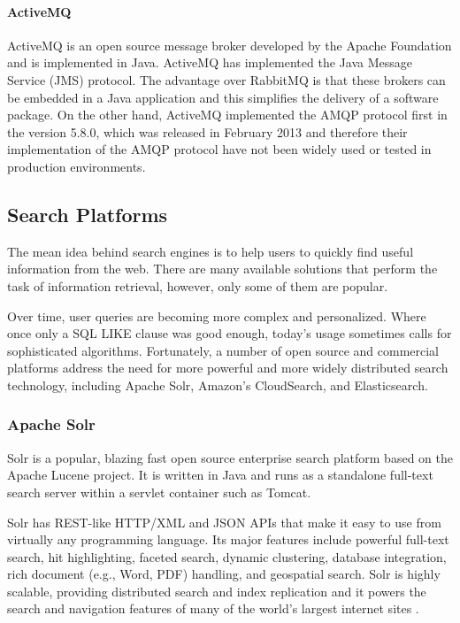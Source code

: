 \begin{itemize}
\end{itemize}

\paragraph{ActiveMQ}
ActiveMQ is an open source message broker developed by the Apache Foundation and is implemented in Java. ActiveMQ has implemented the Java Message Service (JMS) protocol. The advantage over RabbitMQ is that these brokers can be embedded in a Java application and this simplifies the delivery of a software package. On the other hand, ActiveMQ implemented the \ac{AMQP} protocol first in the version 5.8.0, which was released in February 2013 and therefore their implementation of the \ac{AMQP} protocol have not been widely used or tested in production environments.

\subsection{Search Platforms \label{sec:back_se_en}}
The mean idea behind search engines is to help users to quickly find useful information from the web. There are many available solutions that  perform the task of information retrieval, however, only some of them are popular.

Over time, user queries are becoming more complex and personalized. Where once only a \ac{SQL} LIKE clause was good enough, today's usage sometimes calls for sophisticated algorithms. Fortunately, a number of open source and commercial platforms address the need for more powerful and more widely distributed search technology, including Apache Solr, Amazon's CloudSearch, and Elasticsearch.

\subsubsection{Apache Solr \label{sec:back_se_solr}}

Solr is a popular, blazing fast open source enterprise search platform based on the Apache Lucene project. It is written in Java and runs as a standalone full-text search server within a servlet container such as Tomcat. 

Solr has \ac{REST}-like \ac{HTTP}/\ac{XML} and \ac{JSON} \ac{API}s that make it easy to use from virtually any programming language. Its major features include powerful full-text search, hit highlighting, faceted search, dynamic clustering, database integration, rich document (e.g., Word, PDF) handling, and geospatial search. Solr is highly scalable, providing distributed search and index replication and it powers the search and navigation features of many of the world's largest internet sites \cite{welcome_to_solr}.


